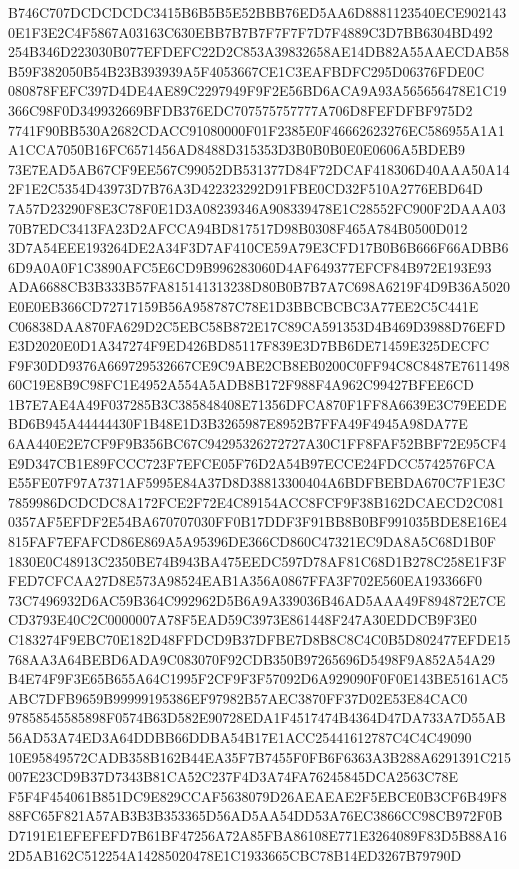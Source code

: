 \documentclass[UTF8,fontset=fandol,zihao=-4,a4paper]{ctexart}
\begin{document}
{{B746C707DCDCDCDC3415B6B5B5E52BBB76ED5AA6D8881123540ECE9021430E1F3E2C4F5867A03163C630EBB7B7B7F7F7F7D7F4889C3D7BB6304BD492
254B346D223030B077EFDEFC22D2C853A39832658AE14DB82A55AAECDAB58B59F382050B54B23B393939A5F4053667CE1C3EAFBDFC295D06376FDE0C
080878FEFC397D4DE4AE89C2297949F9F2E56BD6ACA9A93A565656478E1C19366C98F0D349932669BFDB376EDC707575757777A706D8FEFDFBF975D2
7741F90BB530A2682CDACC91080000F01F2385E0F46662623276EC586955A1A1A1CCA7050B16FC6571456AD8488D315353D3B0B0B0E0E0606A5BDEB9
73E7EAD5AB67CF9EE567C99052DB531377D84F72DCAF418306D40AAA50A142F1E2C5354D43973D7B76A3D422323292D91FBE0CD32F510A2776EBD64D
7A57D23290F8E3C78F0E1D3A08239346A908339478E1C28552FC900F2DAAA0370B7EDC3413FA23D2AFCCA94BD817517D98B0308F465A784B0500D012
3D7A54EEE193264DE2A34F3D7AF410CE59A79E3CFD17B0B6B666F66ADBB66D9A0A0F1C3890AFC5E6CD9B996283060D4AF649377EFCF84B972E193E93
ADA6688CB3B333B57FA815141313238D80B0B7B7A7C698A6219F4D9B36A5020E0E0EB366CD72717159B56A958787C78E1D3BBCBCBC3A77EE2C5C441E
C06838DAA870FA629D2C5EBC58B872E17C89CA591353D4B469D3988D76EFDE3D2020E0D1A347274F9ED426BD85117F839E3D7BB6DE71459E325DECFC
F9F30DD9376A669729532667CE9C9ABE2CB8EB0200C0FF94C8C8487E761149860C19E8B9C98FC1E4952A554A5ADB8B172F988F4A962C99427BFEE6CD
1B7E7AE4A49F037285B3C385848408E71356DFCA870F1FF8A6639E3C79EEDEBD6B945A44444430F1B48E1D3B3265987E8952B7FFA49F4945A98DA77E
6AA440E2E7CF9F9B356BC67C94295326272727A30C1FF8FAF52BBF72E95CF4E9D347CB1E89FCCC723F7EFCE05F76D2A54B97ECCE24FDCC5742576FCA
E55FE07F97A7371AF5995E84A37D8D38813300404A6BDFBEBDA670C7F1E3C7859986DCDCDC8A172FCE2F72E4C89154ACC8FCF9F38B162DCAECD2C081
0357AF5EFDF2E54BA670707030FF0B17DDF3F91BB8B0BF991035BDE8E16E4815FAF7EFAFCD86E869A5A95396DE366CD860C47321EC9DA8A5C68D1B0F
1830E0C48913C2350BE74B943BA475EEDC597D78AF81C68D1B278C258E1F3FFED7CFCAA27D8E573A98524EAB1A356A0867FFA3F702E560EA193366F0
73C7496932D6AC59B364C992962D5B6A9A339036B46AD5AAA49F894872E7CECD3793E40C2C0000007A78F5EAD59C3973E861448F247A30EDDCB9F3E0
C183274F9EBC70E182D48FFDCD9B37DFBE7D8B8C8C4C0B5D802477EFDE15768AA3A64BEBD6ADA9C083070F92CDB350B97265696D5498F9A852A54A29
B4E74F9F3E65B655A64C1995F2CF9F3F57092D6A929090F0F0E143BE5161AC5ABC7DFB9659B99999195386EF97982B57AEC3870FF37D02E53E84CAC0
97858545585898F0574B63D582E90728EDA1F4517474B4364D47DA733A7D55AB56AD53A74ED3A64DDBB66DDBA54B17E1ACC25441612787C4C4C49090
10E95849572CADB358B162B44EA35F7B7455F0FB6F6363A3B288A6291391C215007E23CD9B37D7343B81CA52C237F4D3A74FA76245845DCA2563C78E
F5F4F454061B851DC9E829CCAF5638079D26AEAEAE2F5EBCE0B3CF6B49F888FC65F821A57AB3B3B353365D56AD5AA54DD53A76EC3866CC98CB972F0B
D7191E1EFEFEFD7B61BF47256A72A85FBA86108E771E3264089F83D5B88A162D5AB162C512254A14285020478E1C1933665CBC78B14ED3267B79790D
}}
\end{document}

